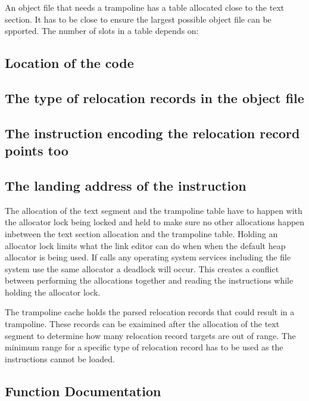 An object file that needs a trampoline has a table allocated close to the text section. It has to be close to ensure the largest possible object file can be spported. The number of slots in a table depends on\+:

\subsection*{Location of the code}

\subsection*{The type of relocation records in the object file}

\subsection*{The instruction encoding the relocation record points too}

\subsection*{The landing address of the instruction}

The allocation of the text segment and the trampoline table have to happen with the allocator lock being locked and held to make sure no other allocations happen inbetween the text section allocation and the trampoline table. Holding an allocator lock limits what the link editor can do when when the default heap allocator is being used. If calls any operating system services including the file system use the same allocator a deadlock will occur. This creates a conflict between performing the allocations together and reading the instructions while holding the allocator lock.

The trampoline cache holds the parsed relocation records that could result in a trampoline. These records can be exaimined after the allocation of the text segment to determine how many relocation record target\textquotesingle{}s are out of range. The minimum range for a specific type of relocation record has to be used as the instructions cannot be loaded. 

\subsection{Function Documentation}
\mbox{\label{rtl-trampoline_8h_a996f6ce5f419e92e3d4b00093da4320e}} 

